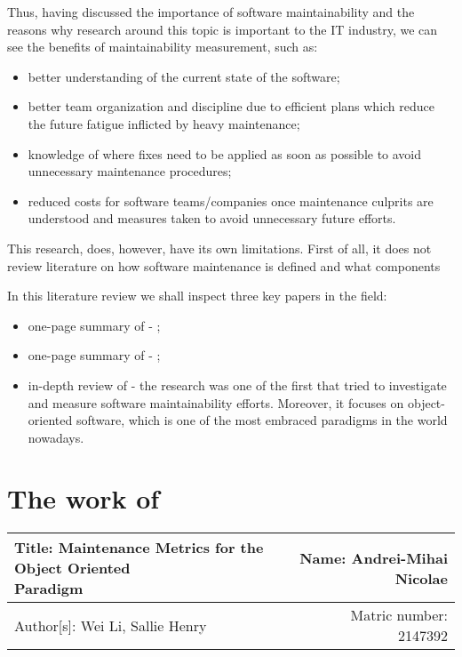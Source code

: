 \documentclass[a4paper,portrait,12pt]{article}
\begin{document}
  Thus, having discussed the importance of software maintainability and the
  reasons why research around this topic is important to the IT industry,
  we can see the benefits of maintainability measurement, such as:
    \begin{itemize}
      \item better understanding of the current state of the software;
      \item better team organization and discipline due to efficient plans 
      which reduce the future fatigue inflicted by heavy maintenance;
      \item knowledge of where fixes need to be applied as soon as possible
      to avoid unnecessary maintenance procedures;
      \item reduced costs for software teams/companies once maintenance 
      culprits are understood and measures taken to avoid unnecessary future
      efforts.
    \end{itemize}

  This research, does, however, have its own limitations. First of all, it does
  not review literature on how software maintenance is defined and what 
  components 
  
  In this literature review we shall inspect three key papers in the field:
    \begin{itemize}
      \item one-page summary of \citet{oman1992metrics} - ;
      \item one-page summary of \citet{pfleeger1990framework} - ;
      \item in-depth review of \citet{li1993maintenance} - the research was one of the
        first that tried to investigate and measure software maintainability efforts. 
        Moreover, it focuses on object-oriented software, which is one of the most
        embraced paradigms in the world nowadays.
    \end{itemize}

\section{The work of \cite{li1993maintenance}}

 \begin{center}
   \begin{tabular}{ | l | r | }
    \hline
    \parbox[t]{5cm}{Title: Maintenance Metrics for the Object Oriented
                    \\ Paradigm} 
     & Name: Andrei-Mihai Nicolae \\ 
     \hline
     Author[s]: Wei Li, Sallie Henry & Matric number: 2147392 \\
    \hline
   \end{tabular}
 \end{center}
\end{document}
